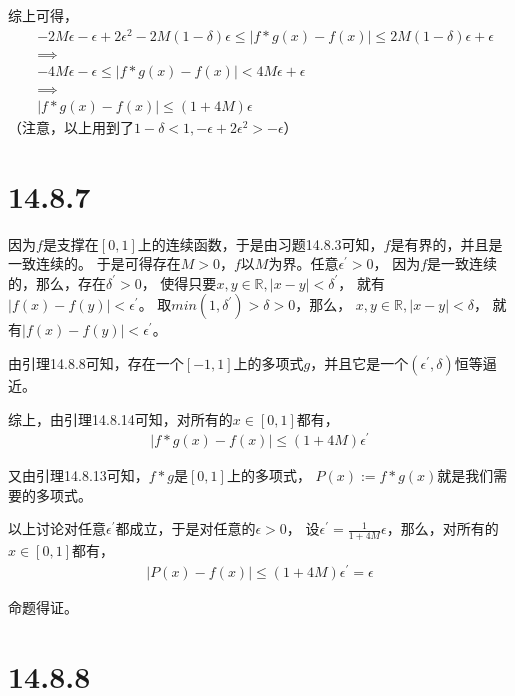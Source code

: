 \documentclass{article}
\begin{document}
\begin{itemize}
        综上可得，
        \begin{align*}
           & -2M\epsilon - \epsilon + 2\epsilon^2 -2M(1-\delta)\epsilon \leq |f \ast g(x) - f(x)| \leq 2M(1-\delta)\epsilon + \epsilon \\
           & \implies                                                                                                                  \\
           & -4M\epsilon - \epsilon \leq |f \ast g(x) - f(x)| < 4M\epsilon + \epsilon                                                  \\
           & \implies                                                                                                                  \\
           & |f \ast g(x) - f(x)| \leq (1 + 4M)\epsilon
        \end{align*}
        （注意，以上用到了$1 - \delta < 1, - \epsilon + 2\epsilon^2 > -\epsilon$）

\end{itemize}

\section*{14.8.7}

因为$f$是支撑在$[0,1]$上的连续函数，于是由习题14.8.3可知，$f$是有界的，并且是一致连续的。
于是可得存在$M > 0$，$f$以$M$为界。任意$\epsilon^\prime > 0$，
因为$f$是一致连续的，那么，存在$\delta^\prime > 0$，
使得只要$x, y \in \mathbb{R}, |x - y| < \delta^\prime$，
就有$|f(x) - f(y)| < \epsilon^\prime$。
取$min(1, \delta^\prime) > \delta > 0$，那么，
$x, y \in \mathbb{R}, |x - y| < \delta$，
就有$|f(x) - f(y)| < \epsilon^\prime$。

由引理14.8.8可知，存在一个$[-1, 1]$上的多项式$g$，并且它是一个$(\epsilon^\prime, \delta)$恒等逼近。

综上，由引理14.8.14可知，对所有的$x \in [0, 1]$都有，
\begin{align*}
  |f \ast g(x) - f(x)| \leq (1 + 4M)\epsilon^\prime
\end{align*}

又由引理14.8.13可知，$f \ast g$是$[0, 1]$上的多项式，
$P(x) := f \ast g(x)$就是我们需要的多项式。

以上讨论对任意$\epsilon^\prime$都成立，于是对任意的$\epsilon > 0$，
设$\epsilon^\prime = \frac{1}{1+4M}\epsilon$，那么，对所有的$x \in [0, 1]$都有，
\begin{align*}
  |P(x) - f(x)| \leq (1 + 4M)\epsilon^\prime = \epsilon
\end{align*}

命题得证。

\section*{14.8.8}
\end{document}
